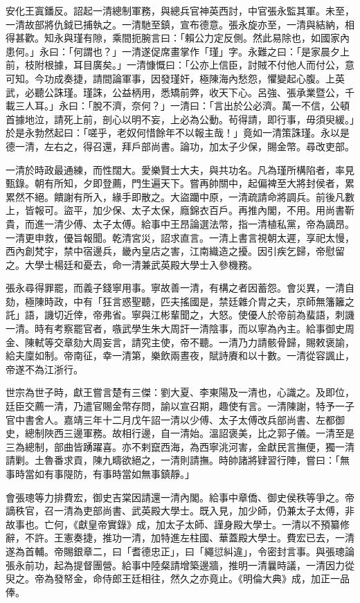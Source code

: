 \begin{pinyinscope}
安化王寘鐇反。詔起一清總制軍務，與總兵官神英西討，中官張永監其軍。未至，一清故部將仇鉞已捕執之。一清馳至鎮，宣布德意。張永旋亦至，一清與結納，相得甚歡。知永與瑾有隙，乘間扼腕言曰：「賴公力定反側。然此易除也，如國家內患何。」永曰：「何謂也？」一清遂促席畫掌作「瑾」字。永難之曰：「是家晨夕上前，枝附根據，耳目廣矣。」一清慷慨曰：「公亦上信臣，討賊不付他人而付公，意可知。今功成奏捷，請間論軍事，因發瑾奸，極陳海內愁怨，懼變起心腹。上英武，必聽公誅瑾。瑾誅，公益柄用，悉矯前弊，收天下心。呂強、張承業暨公，千載三人耳。」永曰：「脫不濟，奈何？」一清曰：「言出於公必濟。萬一不信，公頓首據地泣，請死上前，剖心以明不妄，上必為公動。茍得請，即行事，毋須臾緩。」於是永勃然起曰：「嗟乎，老奴何惜餘年不以報主哉！」竟如一清策誅瑾。永以是德一清，左右之，得召還，拜戶部尚書。論功，加太子少保，賜金幣。尋改吏部。

一清於時政最通練，而性闊大。愛樂賢士大夫，與共功名。凡為瑾所構陷者，率見甄錄。朝有所知，夕即登薦，門生遍天下。嘗再帥關中，起偏裨至大將封侯者，累累然不絕。饋謝有所入，緣手即散之。大盜躪中原，一清疏請命將調兵。前後凡數上，皆報可。盜平，加少保、太子太保，廕錦衣百戶。再推內閣，不用。用尚書靳貴，而進一清少傅、太子太傅。給事中王昂論選法幣，指一清植私黨，帝為謫昂。一清更申救，優旨報聞。乾清宮災，詔求直言。一清上書言視朝太遲，享祀太慢，西內創梵宇，禁中宿邊兵，畿內皇店之害，江南織造之擾。因引疾乞歸，帝慰留之。大學士楊廷和憂去，命一清兼武英殿大學士入參機務。

張永尋得罪罷，而義子錢寧用事。寧故善一清，有構之者因蓄怨。會災異，一清自劾，極陳時政，中有「狂言惑聖聽，匹夫搖國是，禁廷雜介胄之夫，京師無籓籬之託」語，譏切近倖，帝弗省。寧與江彬輩聞之，大怒。使優人於帝前為蜚語，刺譏一清。時有考察罷官者，嗾武學生朱大周訐一清陰事，而以寧為內主。給事御史周金、陳軾等交章劾大周妄言，請究主使，帝不聽。一清乃力請骸骨歸，賜敕褒諭，給夫廩如制。帝南征，幸一清第，樂飲兩晝夜，賦詩賡和以十數。一清從容諷止，帝遂不為江浙行。

世宗為世子時，獻王嘗言楚有三傑：劉大夏、李東陽及一清也，心識之。及即位，廷臣交薦一清，乃遣官賜金幣存問，諭以宣召期，趣使有言。一清陳謝，特予一子官中書舍人。嘉靖三年十二月戊午詔一清以少傅、太子太傅改兵部尚書、左都御史，總制陜西三邊軍務。故相行邊，自一清始。溫詔褒美，比之郭子儀。一清至是三為總制，部曲皆踴躍喜。亦不剌竄西海，為西寧洮河害，金獻民言撫便，獨一清請剿。土魯番求貢，陳九疇欲絕之，一清則請撫。時帥諸將肄習行陣，嘗曰：「無事時當如有事隄防，有事時當如無事鎮靜。」

會張璁等力排費宏，御史吉棠因請還一清內閣。給事中章僑、御史侯秩等爭之。帝謫秩官，召一清為吏部尚書、武英殿大學士。既入見，加少師，仍兼太子太傅，非故事也。亡何，《獻皇帝實錄》成，加太子太師、謹身殿大學士。一清以不預纂修辭，不許。王憲奏捷，推功一清，加特進左柱國、華蓋殿大學士。費宏已去，一清遂為首輔。帝賜銀章二，曰「耆德忠正」，曰「繩愆糾違」，令密封言事。與張璁論張永前功，起為提督團營。給事中陸粲請增築邊牆，推明一清曩時議，一清因力從臾之。帝為發帑金，命侍郎王廷相往，然久之亦竟止。《明倫大典》成，加正一品俸。


\end{pinyinscope}

